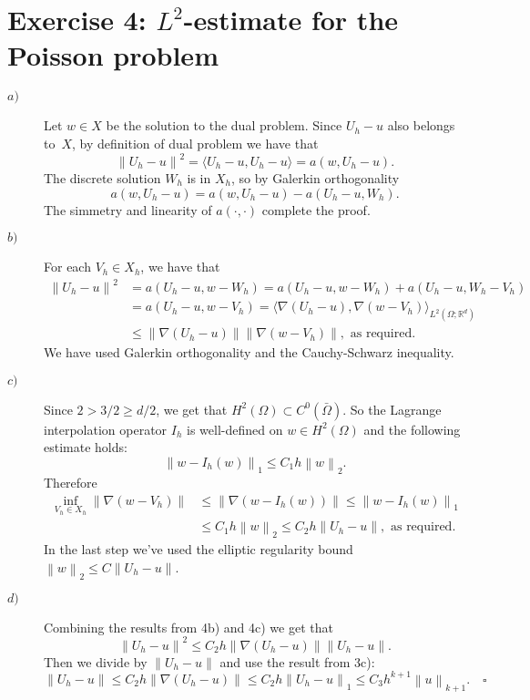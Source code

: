 \documentclass[a4paper]{article}
\newcommand{\norm}[1]{\left\lVert#1\right\rVert}
\newcommand{\R}{\mathbb{R}}
\begin{document}
\section*{Exercise 4: $L^2$-estimate for the Poisson problem}
\begin{description}
\item[$a)$] Let $w \in X$ be the solution to the dual problem.
	Since $U_h - u$ also belongs to~$X$, by definition of dual problem we have that
	\[
	\norm{U_h-u}^2 = \langle U_h-u, U_h-u \rangle = a(w, U_h-u).
	\]
	The discrete solution $W_h$ is in $X_h$, so by Galerkin orthogonality
	\[
	a(w, U_h-u) = a(w, U_h-u) - a(U_h-u, W_h).
	\]
	The simmetry and linearity of $a(\cdot,\cdot)$ complete the proof.
\item[$b)$] For each $V_h \in X_h$, we have that
	\begin{align*}
	\norm{U_h-u}^2
&	= a(U_h-u, w-W_h)
	= a(U_h-u, w-W_h) + a(U_h-u, W_h-V_h) \\
&	= a(U_h-u, w-V_h)
	= \langle \nabla (U_h-u), \nabla (w-V_h) \rangle_{L^2(\Omega;\R^d)} \\
&	\leq \norm{\nabla (U_h-u)} \norm{\nabla (w-V_h)}, \text{ as required.}
	\end{align*}
	We have used Galerkin orthogonality and the Cauchy-Schwarz inequality.
\item[$c)$] Since $2 > 3/2 \geq d/2$,
	we get that $H^2(\Omega) \subset C^0(\bar{\Omega})$.
	So the Lagrange interpolation operator $I_h$ is well-defined
	on $w \in H^2(\Omega)$ and the following estimate holds:
	\[
	\norm{w-I_h(w)}_1 \leq C_1 h \norm{w}_2.
	\]
	Therefore
	\begin{align*}
	\inf_{V_h \in X_h} \norm{\nabla (w-V_h)}
&	\leq \norm{\nabla (w-I_h(w))}
	\leq \norm{w-I_h(w)}_1 \\
&	\leq C_1 h \norm{w}_2
	\leq C_2 h \norm{U_h-u}, \text{ as required.}
	\end{align*}
	In the last step we've used the elliptic regularity bound
	$\norm{w}_2 \leq C \norm{U_h-u}$.
\item[$d)$] Combining the results from 4b) and 4c) we get that
	\[
	\norm{U_h-u}^2 \leq C_2 h \norm{\nabla (U_h-u)} \norm{U_h-u}.
	\]
	Then we divide by $\norm{U_h-u}$ and use the result from 3c):
	\[
	\norm{U_h-u}
	\leq C_2 h \norm{\nabla (U_h-u)}
	\leq C_2 h \norm{U_h-u}_1
	\leq C_3 h^{k+1} \norm{u}_{k+1}. \quad \square
	\]
\end{description}
\end{document}

